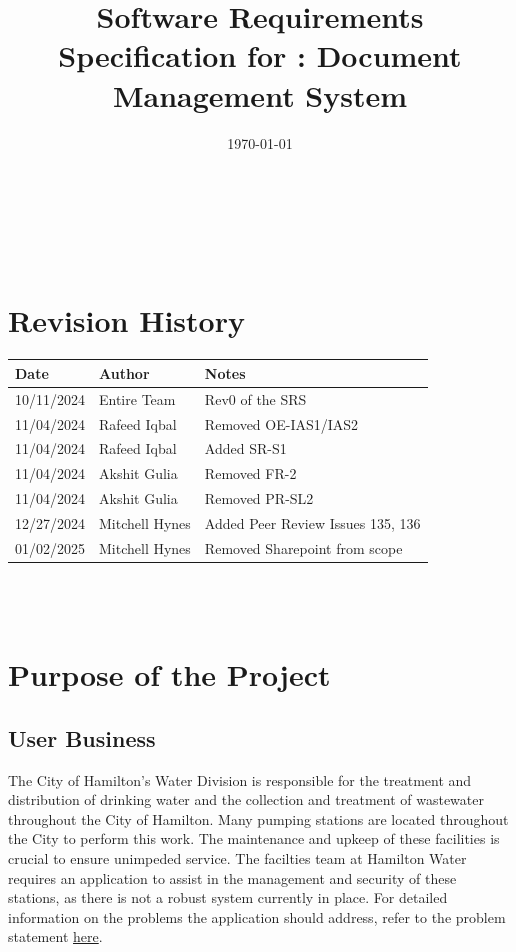 \documentclass[12pt]{article}
\begin{document}
\title{Software Requirements Specification for \progname: Document
Management System}
\author{\authname}
\date{\today}

\maketitle

~\newpage


\tableofcontents

~\newpage

\section*{Revision History}

\begin{tabularx}{\textwidth}{p{3cm}p{3cm}X}
  \toprule {\textbf{Date}} & {\textbf{Author}} & {\textbf{Notes}}\\
  \midrule
  10/11/2024 & Entire Team & Rev0 of the SRS\\
  11/04/2024 & Rafeed Iqbal & Removed OE-IAS1/IAS2\\
  11/04/2024 & Rafeed Iqbal & Added SR-S1\\
  11/04/2024 & Akshit Gulia & Removed FR-2\\
  11/04/2024 & Akshit Gulia & Removed PR-SL2\\
  12/27/2024 & Mitchell Hynes & Added Peer Review Issues 135, 136\\
  01/02/2025 & Mitchell Hynes & Removed Sharepoint from scope\\
  \bottomrule
\end{tabularx}

~\\

~\newpage
\section{Purpose of the Project}
\subsection{User Business}
The City of Hamilton's Water Division is responsible for the
treatment and distribution of drinking water and the collection and
treatment of wastewater throughout the City of Hamilton. Many pumping
stations are located throughout the City to perform this work. The
maintenance and upkeep of these facilities is crucial to ensure
unimpeded service. The facilties team at Hamilton Water requires an
application to assist in the management and security of these
stations, as there is not a robust system currently in place. For
detailed information on the problems the application should address,
refer to the problem statement
\href{https://github.com/Spitgranger/capstone/blob/main/docs/ProblemStatementAndGoals/ProblemStatement.pdf}{here}.
\end{document}
